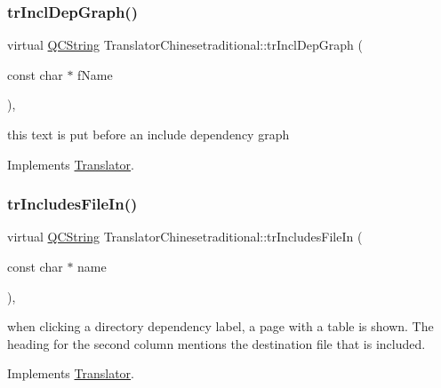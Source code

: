 \subsubsection{\texorpdfstring{trInclDepGraph()}{trInclDepGraph()}}
{\footnotesize\ttfamily virtual \mbox{\hyperlink{class_q_c_string}{Q\+C\+String}} Translator\+Chinesetraditional\+::tr\+Incl\+Dep\+Graph (\begin{DoxyParamCaption}\item[{const char $\ast$}]{f\+Name }\end{DoxyParamCaption})\hspace{0.3cm}{\ttfamily [inline]}, {\ttfamily [virtual]}}

this text is put before an include dependency graph 

Implements \mbox{\hyperlink{class_translator}{Translator}}.

\mbox{\label{class_translator_chinesetraditional_ad41ba324119546456ffe0ef517513aa2}} 
\subsubsection{\texorpdfstring{trIncludesFileIn()}{trIncludesFileIn()}}
{\footnotesize\ttfamily virtual \mbox{\hyperlink{class_q_c_string}{Q\+C\+String}} Translator\+Chinesetraditional\+::tr\+Includes\+File\+In (\begin{DoxyParamCaption}\item[{const char $\ast$}]{name }\end{DoxyParamCaption})\hspace{0.3cm}{\ttfamily [inline]}, {\ttfamily [virtual]}}

when clicking a directory dependency label, a page with a table is shown. The heading for the second column mentions the destination file that is included. 

Implements \mbox{\hyperlink{class_translator}{Translator}}.

\mbox{\label{class_translator_chinesetraditional_a790281b961ba62ba8135fc4bb483e8f3}} 

